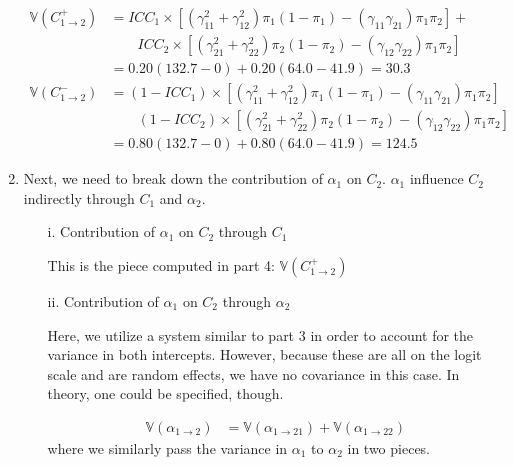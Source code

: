 \documentclass[12pt]{article}
\begin{document}
\begin{enumerate}
\begin{align*}
\mathbb{V}(C_{1\rightarrow 2}^{+}) &= ICC_1\times\left[\left(\gamma_{11}^2+\gamma_{12}^2\right)\pi_{1}(1-\pi_{1}) - \left(\gamma_{11}\gamma_{21}\right)\pi_{1}\pi_{2}\right] + \\
&\qquad ICC_2\times\left[\left(\gamma_{21}^2+ \gamma_{22}^2\right)\pi_{2}(1-\pi_{2}) - \left(\gamma_{12}\gamma_{22}\right)\pi_{1}\pi_{2}\right]\\
&= 0.20(132.7-0) + 0.20(64.0-41.9)= 30.3\\
\mathbb{V}(C_{1\rightarrow 2}^{-}) &= (1-ICC_1)\times\left[\left(\gamma_{11}^2+\gamma_{12}^2\right)\pi_{1}(1-\pi_{1}) - \left(\gamma_{11}\gamma_{21}\right)\pi_{1}\pi_{2}\right]\\
&\qquad (1-ICC_2)\times\left[\left(\gamma_{21}^2+ \gamma_{22}^2\right)\pi_{2}(1-\pi_{2}) - \left(\gamma_{12}\gamma_{22}\right)\pi_{1}\pi_{2}\right]\\
&= 0.80(132.7-0) + 0.80(64.0-41.9) = 124.5
\end{align*}

\item Next, we need to break down the contribution of $\alpha_1$ on $C_2$. $\alpha_1$ influence $C_2$ indirectly through $C_1$ and $\alpha_2$.

\begin{itemize}
\item[i.] Contribution of $\alpha_1$ on $C_2$ through $C_1$

This is the piece computed in part 4: $\mathbb{V}(C_{1\rightarrow 2}^{+})$
\item[ii.] Contribution of $\alpha_1$ on $C_2$ through $\alpha_2$

Here, we utilize a system similar to part 3 in order to account for the variance in both intercepts. However, because these are all on the logit scale and are random effects, we have no covariance in this case. In theory, one could be specified, though.

\begin{align*}
\mathbb{V}(\alpha_{1\rightarrow 2})&= \mathbb{V}(\alpha_{1\rightarrow 21}) + \mathbb{V}(\alpha_{1\rightarrow 22})
\end{align*}
where we similarly pass the variance in $\alpha_1$ to $\alpha_2$ in two pieces.


\end{itemize}
\end{enumerate}
\end{document}
